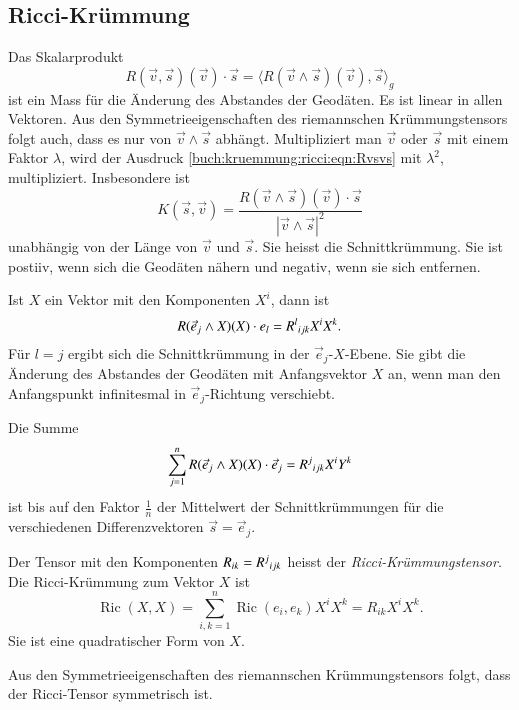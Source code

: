 %
%
\subsection{Ricci-Krümmung}
Das Skalarprodukt
\begin{equation}
R(\vec{v},\vec{s})(\vec{v})\cdot\vec{s}
=
\langle
R(\vec{v}\wedge\vec{s})(\vec{v}) ,\vec{s}
\rangle_g
\label{buch:kruemmung:ricci:eqn:Rvsvs}
\end{equation}
ist ein Mass für die Änderung des Abstandes der Geodäten.
Es ist linear in allen Vektoren.
Aus den Symmetrieeigenschaften des riemannschen Krümmungstensors folgt
auch, dass es nur von $\vec{v}\wedge\vec{s}$ abhängt.
Multipliziert man $\vec{v}$ oder $\vec{s}$ mit einem Faktor $\lambda$,
wird  der Ausdruck \eqref{buch:kruemmung:ricci:eqn:Rvsvs} mit
$\lambda^2$, multipliziert.
Insbesondere ist
\[
K(\vec{s},\vec{v})
=
\frac{R(\vec{v}\wedge\vec{s})(\vec{v})\cdot\vec{s}}{|\vec{v}\wedge\vec{s}|^2}
\]
unabhängig von der Länge von $\vec{v}$ und $\vec{s}$.
Sie heisst die Schnittkrümmung.
Sie ist postiiv, wenn sich die Geodäten nähern und negativ, wenn sie
sich entfernen.

Ist $X$ ein Vektor mit den Komponenten $X^i$, dann ist
\[
R(\vec{e}_j\wedge X)(X)\cdot e_l
=
R^l\mathstrut_{ijk}X^iX^k.
\]
Für $l=j$ ergibt sich die Schnittkrümmung in der $\vec{e}_j$-$X$-Ebene.
Sie gibt die Änderung des Abstandes der Geodäten mit
Anfangsvektor $X$ an, wenn man den Anfangspunkt infinitesmal in
$\vec{e}_j$-Richtung verschiebt.

Die Summe
\begin{equation}
\sum_{j=1}^n
R(\vec{e}_j\wedge X)(X)\cdot \vec{e}_j
=
R^j\mathstrut_{ijk} X^iY^k
\label{buch:kruemmung:ricci:eqn:ricci}
\end{equation}
ist bis auf den Faktor $\frac1n$ der Mittelwert der Schnittkrümmungen
für die verschiedenen Differenzvektoren $\vec{s}=\vec{e}_j$.

\begin{definition}
\label{buch:kruemmung:ricci:def:ricci-kruemmung}
Der Tensor mit den Komponenten $R_{ik}=R^j\mathstrut_{ijk}$ heisst
der {\em Ricci-Krümmungstensor}.
Die Ricci-Krümmung zum Vektor $X$ ist
\[
\operatorname{Ric}(X,X)
=
\sum_{i,k=1}^n
\operatorname{Ric}(e_i,e_k)X^iX^k
=
R_{ik}X^iX^k.
\]
Sie ist eine quadratischer Form von $X$.
\end{definition}

Aus den Symmetrieeigenschaften des riemannschen Krümmungstensors folgt,
dass der Ricci-Tensor symmetrisch ist.


